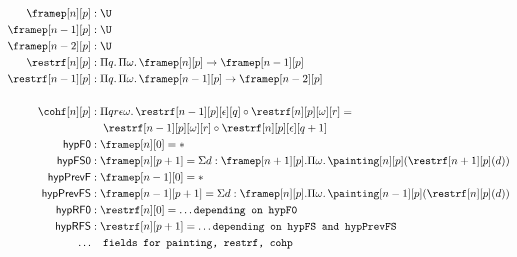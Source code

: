 \documentclass{msc}
\newcommand{\unitpoint}{\ensuremath{\ast}}
\begin{document}
\begin{align*}
  \framep[n][p]      & : \U                                                                                                                 \\
  \framep[n-1][p]    & :  \U                                                                                                                \\
  \framep[n-2][p]    & : \U                                                                                                                 \\
  \restrf[n][p]      & : \Pi q.\, \Pi \omega.\, \framep[n][p] \rightarrow \framep[n-1][p]                                                   \\
  \restrf[n-1][p]    & : \Pi q.\, \Pi \omega.\, \framep[n-1][p] \rightarrow \framep[n-2][p]                                                 \\                                                                 \\
  \cohf[n][p]        & : \Pi qr\epsilon\omega.\, \restrf[n-1][p][\epsilon][q] \circ \restrf[n][p][\omega][r] =                              \\
                     & \;\;\;\;\restrf[n-1][p][\omega][r] \circ \restrf[n][p][\epsilon][q+1]                                                \\
  \mathsf{hypF0}     & : \framep[n][0]         = \unitpoint
  \\
  \mathsf{hypFS0}    & : \framep[n][p+1]       = \Sigma d: \framep[n+1][p]. \Pi \omega.\, \painting[n][p] (\restrf[n+1][p](d))              \\
  \mathsf{hypPrevF}  & : \framep[n-1][0]                                                                                       = \unitpoint \\
  \mathsf{hypPrevFS} & : \framep[n-1][p+1] = \Sigma d: \framep[n][p]. \Pi \omega.\, \painting[n-1][p] (\restrf[n][p](d))                    \\
  \mathsf{hypRF0}    & : \restrf[n][0]        = \ldots \texttt{depending on hypF0}                                                          \\
  \mathsf{hypRFS}    & : \restrf[n][p+1]      = \ldots \texttt{depending on hypFS and hypPrevFS}                                            \\
  \ldots             & \;\;\;\;\texttt{fields for painting, restrf, cohp}
\end{align*}
\end{document}
